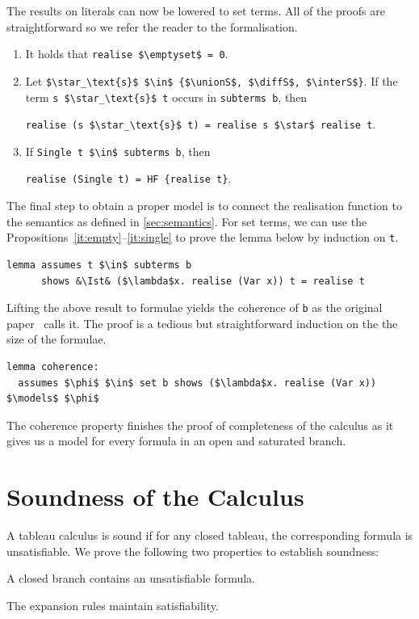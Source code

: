 \documentclass[runningheads]{llncs}
\newcommand{\unionS}{\sqcup_\text{s}}
\newcommand{\interS}{\sqcap_\text{s}}
\newcommand{\diffS}{-_\text{s}}
\newcommand{\Ist}{I$_\text{st}$}
\begin{document}
\noindent The results on literals can now be lowered to set terms.
All of the proofs are straightforward so we refer the reader to the formalisation.
\begin{enumerate}[label=(\alph*)]
  \item\label{it:empty} It holds that \lstinline!realise $\emptyset$ = 0!.
  \item\label{it:op} Let \lstinline!$\star_\text{s}$ $\in$ {$\unionS$, $\diffS$, $\interS$}!. If the term \lstinline!s $\star_\text{s}$ t! occurs in \lstinline!subterms b!, then
    \begin{center}
    \lstinline!realise (s $\star_\text{s}$ t) = realise s $\star$ realise t!.
    \end{center}
  \item\label{it:single} If \lstinline!Single t $\in$ subterms b!, then
    \begin{center}
    \lstinline!realise (Single t) = HF {realise t}!.
    \end{center}
\end{enumerate}

The final step to obtain a proper model is to connect the realisation function to the semantics as defined in \autoref{sec:semantics}.
For set terms, we can use the Propositions~\ref{it:empty}--\ref{it:single} to prove the lemma below by induction on \lstinline!t!.
\begin{lstlisting}
lemma assumes t $\in$ subterms b
      shows &\Ist& ($\lambda$x. realise (Var x)) t = realise t
\end{lstlisting}
Lifting the above result to formulae yields the coherence of \lstinline!b! as the original paper~\cite{new_fast_tableau} calls it.
The proof is a tedious but straightforward induction on the the size of the formulae.
\begin{lstlisting}[label={lst:coherence}]
lemma coherence:
  assumes $\phi$ $\in$ set b shows ($\lambda$x. realise (Var x)) $\models$ $\phi$
\end{lstlisting}
The coherence property finishes the proof of completeness of the calculus as it gives us a model for every formula in an open and saturated branch.

\section{Soundness of the Calculus\label{sec:sound}}
A tableau calculus is sound if for any closed tableau, the corresponding formula is unsatisfiable. 
We prove the following two properties to establish soundness:
\begin{enumerate*}[label={(\arabic*)}]
  \item A closed branch contains an unsatisfiable formula.
  \item The expansion rules maintain satisfiability.
\end{enumerate*}
\end{document}
